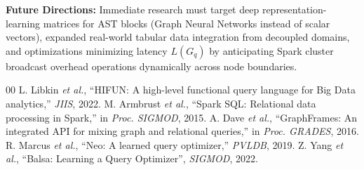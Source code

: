 \documentclass[conference]{IEEEtran}
\begin{document}
\textbf{Future Directions:} Immediate research must target deep representation-learning matrices for AST blocks (Graph Neural Networks instead of scalar vectors), expanded real-world tabular data integration from decoupled domains, and optimizations minimizing latency $L(G_q)$ by anticipating Spark cluster broadcast overhead operations dynamically across node boundaries.

\begin{thebibliography}{00}
 L. Libkin \emph{et al.}, ``HIFUN: A high-level functional query language for Big Data analytics,'' \textit{JIIS}, 2022.
 M. Armbrust \emph{et al.}, ``Spark SQL: Relational data processing in Spark,'' in \textit{Proc. SIGMOD}, 2015.
 A. Dave \emph{et al.}, ``GraphFrames: An integrated API for mixing graph and relational queries,'' in \textit{Proc. GRADES}, 2016.
 R. Marcus \emph{et al.}, ``Neo: A learned query optimizer,'' \textit{PVLDB}, 2019.
 Z. Yang \emph{et al.}, ``Balsa: Learning a Query Optimizer'', \textit{SIGMOD}, 2022.
\end{thebibliography}
\end{document}
